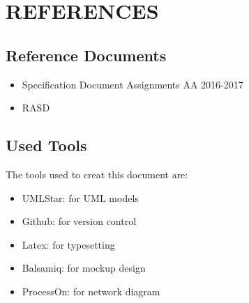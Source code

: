 \documentclass[a4paper,11pt]{article}
\begin{document}
\newpage
\section{REFERENCES}
	\subsection{Reference Documents}
	\begin{itemize}
		\item Specification Document Assignments AA 2016-2017
		\item RASD
	\end{itemize}
	\subsection{Used Tools}
	The tools used to creat this document are:
	\begin{itemize}
		\item UMLStar: for UML models
		\item Github: for version control
		\item Latex: for typesetting
		\item Balsamiq: for mockup design
		\item ProcessOn: for network diagram
		 
	\end{itemize}

\newpage
	
\end{document}
